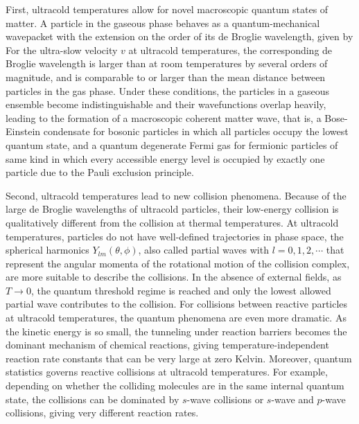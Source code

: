 First, ultracold temperatures allow for novel macroscopic quantum states of matter. A particle in the gaseous phase behaves as a quantum-mechanical 
wavepacket with the extension on the order of its de Broglie wavelength, given by
For the ultra-slow velocity $v$ at ultracold temperatures, the corresponding de Broglie wavelength is larger than at room temperatures by several orders of magnitude, 
and is comparable to or larger than the mean distance between particles in the gas phase. Under these conditions,
the particles in a gaseous ensemble become indistinguishable and their wavefunctions overlap heavily, leading to the formation of
a macroscopic coherent matter wave, that is, a Bose-Einstein condensate\cite{ketterle2002, anglin2002} for bosonic 
particles in which all particles occupy the lowest quantum state, and a quantum degenerate Fermi gas\cite{lev2002, stefano2008} for fermionic 
particles of same kind in which every accessible energy level is occupied by exactly one particle due to the Pauli exclusion principle. 

Second, ultracold temperatures lead to new collision phenomena.
Because of the large de Broglie wavelengths of ultracold particles, their low-energy collision is 
qualitatively different from the collision at thermal temperatures. At ultracold temperatures, particles
do not have well-defined trajectories in phase space, the spherical harmonics $Y_{lm}(\theta, \phi)$, also called 
partial waves with $l = 0, 1, 2, \cdots$ that represent the angular momenta of the rotational motion of the collision complex,  are more suitable to describe the collisions. In the absence of external fields, as $T 
\rightarrow 0$, the quantum threshold regime is reached and only the lowest allowed partial wave contributes to the 
collision\cite{wigner1948, krems2005}. For collisions between reactive particles at ultracold temperatures, the quantum phenomena are
even more dramatic. As the kinetic energy is so small, the tunneling under reaction barriers becomes the 
dominant mechanism of chemical reactions, giving temperature-independent reaction rate constants that 
can be very large at zero Kelvin\cite{balakrishnan2001, bodo2002, bodo2004, weck2004}. Moreover, quantum statistics 
governs reactive collisions at ultracold temperatures. For example, depending on 
whether the colliding molecules are in the same internal quantum state, the collisions can be dominated by 
$s$-wave collisions or $s$-wave and $p$-wave collisions, giving very different reaction rates\cite{ospelkaus2010}. 

